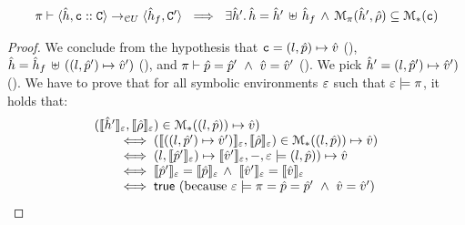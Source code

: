  

 \begin{lemma} 
\label{successful:unification}
$$
\begin{array}{l}
\cellunification{\sheap, \cell \lstcons \cells}{\sheap_f, \cells'}{\pc} \ \implies \
%
     \exists \sheap' . \, \sheap = \sheap' \dunion \sheap_f  \, \wedge \, 
		\smodels{\sheap', \sstore}{\pc} \subseteq \sepmodels{\cell}
\end{array}
$$
 \end{lemma}
 \begin{proof}
%
We conclude from the hypothesis that $\mathtt{c} = (l,\hat{p})\mapsto \hat{v}$ (), 
$\hat{h} = \hat{h}_f \, \uplus \, ((l, \hat{p}') \mapsto \hat{v}')$ (\ieq{2}), and 
$\pi \vdash \hat{p} = \hat{p}' \ \wedge \ \hat{v} = \hat{v}'$ (\ieq{3}). 
We pick $\hat{h}' = (l, \hat{p}') \mapsto \hat{v}')$ (\ieq{4}). 
We have to prove that for all symbolic environments 
$\varepsilon$ such that $\varepsilon \models \pi$, it holds that: 
$$
\begin{array}{l}
(\llbracket \hat{h}' \rrbracket_{\varepsilon}, \llbracket \hat\rho \rrbracket_{\varepsilon}) \in \mathcal{M}_{*}((l, \hat{p}))\mapsto \hat{v}) \\
   \qquad \iff (\llbracket ((l, \hat{p}') \mapsto \hat{v}') \rrbracket_{\varepsilon}, \llbracket \hat\rho \rrbracket_{\varepsilon}) \in \mathcal{M}_{*}((l, \hat{p}))\mapsto \hat{v}) \\
   \qquad \iff  (l, \llbracket \hat{p}' \rrbracket_{\varepsilon}) \mapsto \llbracket \hat{v}' \rrbracket_{\varepsilon}, -, \varepsilon \models (l, \hat{p}))\mapsto \hat{v} \\
   \qquad \iff \llbracket \hat{p}' \rrbracket_{\varepsilon} = \llbracket \hat{p} \rrbracket_{\varepsilon} \, \wedge \ \llbracket \hat{v}' \rrbracket_{\varepsilon} = \llbracket \hat{v} \rrbracket_{\varepsilon} \\
   \qquad \iff {\sf true} \text{ (because } \varepsilon \models \pi = \hat{p} = \hat{p}' \ \wedge \ \hat{v} = \hat{v}' \text{)}
\end{array}
$$
\end{proof}
 
